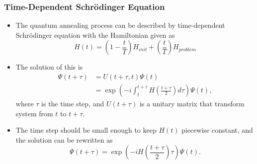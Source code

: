 \documentclass{beamer}
\begin{document}
\begin{frame}
	\frametitle{Time-Dependent Schrödinger Equation}
	
	\begin{itemize}
		\item The quantum annealing process can be described by time-dependent Schrödinger equation with the Hamiltonian given as
		\begin{equation*}
		H(t)=(1-\frac{t}{T} )H_{init}+(\frac{t}{T})H_{problem}
		\end{equation*}
		\item The solution of this is 
		\begin{equation*}
		\begin{split}
		\Psi(t+\tau)&=U(t+\tau,t)\Psi(t)\\
		&=\exp(-i\int_{t}^{t+\tau}H(\frac{t+\tau}{2})d\tau)\Psi(t),
		\end{split}
		\end{equation*}
		where $\tau$ is the time step, and $U(t+\tau)$ is a unitary matrix that transform system from $t$ to $t+\tau$.
		\item 	The time step should be small enough to keep $H(t)$ piecewise constant, and the solution can be rewritten as 
		\begin{equation*}
		\Psi(t+\tau) =\exp(-iH(\frac{t+\tau}{2})\tau)\Psi(t).
		\end{equation*}
		
	\end{itemize}
	


\end{frame}

\end{document}
